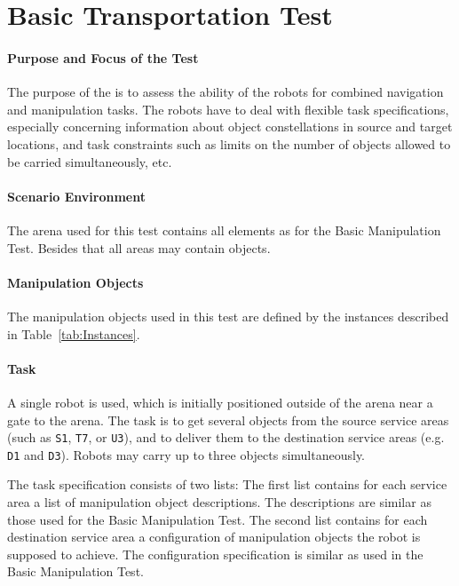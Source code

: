 \newpage
\section{Basic Transportation Test}

\paragraph{Purpose and Focus of the Test}
The purpose of the  is to assess the ability of the robots for combined navigation and manipulation tasks. 
The robots have to deal with flexible task specifications, especially concerning information about object constellations in source and target locations, and task constraints such as limits on the number of objects allowed to be carried simultaneously, etc.  

\paragraph{Scenario Environment}
The arena used for this test contains all elements as for the Basic Manipulation Test. Besides that all areas may contain objects.

\paragraph{Manipulation Objects}
The manipulation objects used in this test are defined by the instances described in Table~\ref{tab:Instances}.

\paragraph{Task}
A single robot is used, which is initially positioned outside of the arena near a gate to the arena. The task is to get several objects from the source service areas (such as \texttt{S1}, \texttt{T7}, or \texttt{U3}), and to deliver them to the destination service areas (e.g. \texttt{D1} and \texttt{D3}). Robots may carry up to three objects simultaneously. 
\par
The task specification consists of two lists:
The first list contains for each service area a list of manipulation object descriptions. The descriptions are similar as those used for the Basic Manipulation Test. 
The second list contains for each destination service area a configuration of manipulation objects the robot is supposed to achieve. The configuration specification is similar as used in the Basic Manipulation Test. 

